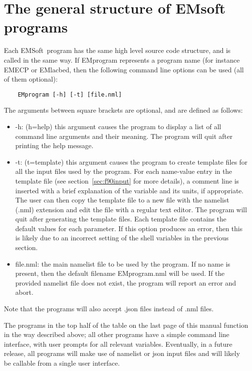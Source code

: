 \documentclass[DIV=calc, paper=letter, fontsize=11pt]{scrartcl}	 %
\newcommand{\ctp}{\textsf{EMSoft}}
\begin{document}
\section{The general structure of EMsoft programs\label{sec:structure}}
Each \ctp\ program has the same high level source code structure, and is called in the same way.  If \textsf{EMprogram} represents 
a program name (for instance \textsf{EMECP} or \textsf{EMlacbed}, then the following command line options can be used (all of them optional):
\begin{verbatim}
	EMprogram [-h] [-t] [file.nml]
\end{verbatim}
The arguments  between square brackets are optional, and are defined as follows:
\begin{itemize}
	\item \textsf{-h}: (h=help) this argument causes the program to display a list of all command line arguments and their meaning.  The program will quit after printing 
	the help message.
	\item \textsf{-t}: (t=template) this argument causes the program to create template files for all the input files used by the program.  For each
	name-value entry in the template file (see section~\ref{sec:f90input} for more details), a comment line is inserted with a brief explanation 
	of the variable and its units, if appropriate.  The user can then copy the template file to a new file with the namelist (.nml) extension and edit the 
	file with a regular text editor.  The program will quit after generating the template files.  Each template file contains the default values for each parameter.
	If this option produces an error, then this is likely due to an incorrect setting of the shell variables in the previous section.
	\item \textsf{file.nml}: the main namelist file to be used by the program.  If no name is present, then the default filename \textsf{EMprogram.nml} will be used.  If the 
	provided namelist file does not exist, the program will report an error and abort.
\end{itemize}
Note that the programs will also accept .json files instead of .nml files.

The programs in the top half of the table on the last page of this manual function in the way described above; all other programs
have a simple command line interface, with user prompts for all relevant variables.  Eventually, in a future release, all programs
will make use of namelist or json input files and will likely be callable from a single user interface.
\end{document}
